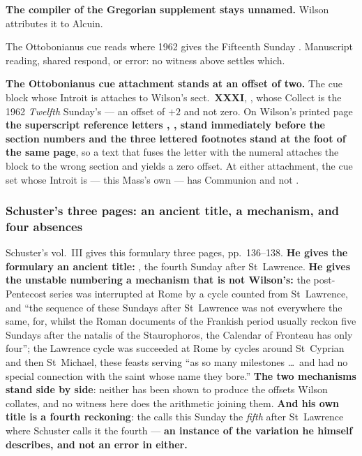 \textbf{The compiler of the Gregorian supplement stays unnamed.} Wilson
attributes it to Alcuin.

The Ottobonianus cue  reads  where 1962
gives the Fifteenth Sunday . Manuscript
reading, shared respond, or error: no witness above settles which.

\textbf{The Ottobonianus cue attachment stands at an offset of two.} The cue
block whose Introit is  attaches to
Wilson's sect.~\textbf{XXXI}, , whose
Collect is the 1962 \emph{Twelfth} Sunday's --- an offset of $+2$ and not zero.
On Wilson's printed page \textbf{the superscript reference
letters , ,  stand immediately before the section
numbers and the three lettered footnotes stand at the foot of the same page},
so a text that fuses the letter with the numeral attaches the block to
the wrong section and yields a zero offset. At either attachment,
the cue set whose Introit is  --- this
Mass's own --- has Communion  and not .

\subsubsection*{Schuster's three pages: an ancient title, a mechanism, and four absences}

Schuster's  vol.~III gives this formulary three pages,
pp.~136--138.
\textbf{He gives the formulary an ancient title:}
, the fourth Sunday after St~Lawrence.
\textbf{He gives the unstable numbering a mechanism that is not Wilson's:} the
post-Pentecost series was interrupted at Rome by a cycle counted from
St~Lawrence, and ``the sequence of these Sundays after St~Lawrence was not
everywhere the same, for, whilst the Roman documents of the Frankish period
usually reckon five Sundays after the natalis of the Staurophoros, the Calendar
of Fronteau has only four''; the Lawrence cycle was succeeded at Rome by cycles
around St~Cyprian and then St~Michael, these feasts serving ``as so many
milestones \dots\ and had no special connection with the saint whose name they
bore.'' \textbf{The two mechanisms stand side by side}: neither has been shown to
produce the offsets Wilson collates, and no witness here does the arithmetic
joining them.
\textbf{And his own title is a fourth reckoning}: the 
calls this Sunday the \emph{fifth} after St~Lawrence where Schuster calls it the
fourth --- \textbf{an instance of the variation he himself describes, and not an
error in either.}

